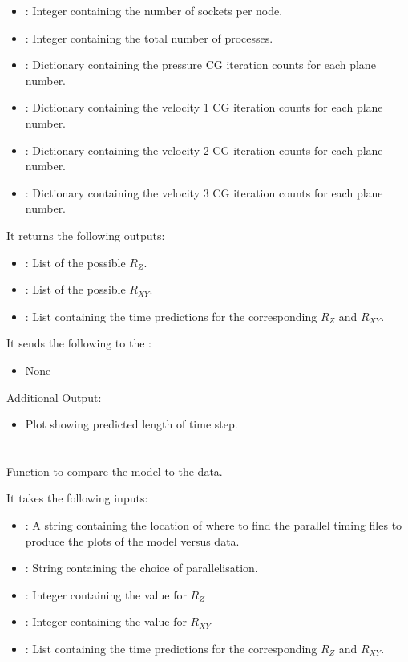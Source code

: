 \begin{itemize}
\item {}: Integer containing the number of sockets per node.
\item {}: Integer containing the total number of processes.
\item {}: Dictionary containing the pressure CG iteration counts for each plane number.
\item {}: Dictionary containing the velocity 1 CG iteration counts for each plane number.
\item {}: Dictionary containing the velocity 2 CG iteration counts for each plane number.
\item {}: Dictionary containing the velocity 3 CG iteration counts for each plane number.
\end{itemize}

It returns the following outputs:

\begin{itemize}
\item {}: List of the possible \(R_Z\).
\item {}: List of the possible \(R_{XY}\).
\item {}: List containing the time predictions for the corresponding \(R_Z\) and \(R_{XY}\).
\end{itemize}

It sends the following to the :

\begin{itemize}
\item None
\end{itemize}

Additional Output:
\begin{itemize}
\item Plot showing predicted length of time step.
\end{itemize}


\section{}
Function to compare the model to the data.

It takes the following inputs:

\begin{itemize}
\item {}: A string containing the location of where to find the parallel timing files to produce the plots of the model versus data.
\item {}: String containing the choice of parallelisation.
\item {}: Integer containing the value for \(R_Z\)
\item {}: Integer containing the value for \(R_{XY}\)
\item {}: List containing the time predictions for the corresponding \(R_Z\) and \(R_{XY}\).
\end{itemize}

